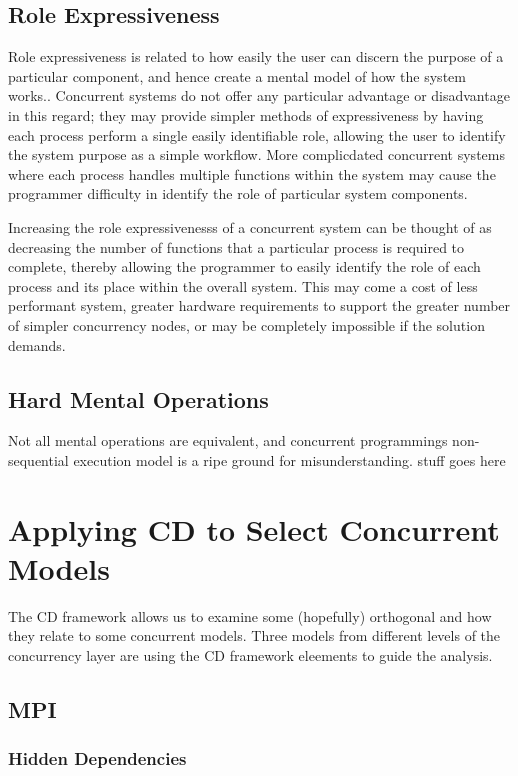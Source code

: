 \documentclass{sig-alternate}
\begin{document}
\subsection{Role Expressiveness}
Role expressiveness is related to how easily the user can discern the purpose of a particular component, and hence create a mental model of how the system works.. Concurrent systems do not offer any particular advantage or disadvantage in this regard; they may provide simpler methods of expressiveness by having each process perform a single easily identifiable role, allowing the user to identify the system purpose as a simple workflow. More complicdated concurrent systems where each process handles multiple functions within the system may cause the programmer difficulty in identify the role of particular system components. 

Increasing the role expressivenesss of a concurrent system can be thought of as decreasing the number of functions that a particular process is required to complete, thereby allowing the programmer to easily identify the role of each process and its place within the overall system. This may come a cost of less performant system, greater hardware requirements to support the greater number of simpler concurrency nodes, or may be completely impossible if the solution demands. 

\subsection{Hard Mental Operations}
Not all mental operations are equivalent, and concurrent programmings non-sequential execution model is a ripe ground for misunderstanding. stuff goes here

\section{Applying CD to Select Concurrent Models}
The CD framework allows us to examine some (hopefully) orthogonal and how they relate to some concurrent models. Three models from different levels of the concurrency layer are using the CD framework eleements to guide the analysis.

\subsection{MPI}
\subsubsection{Hidden Dependencies}
\end{document}
